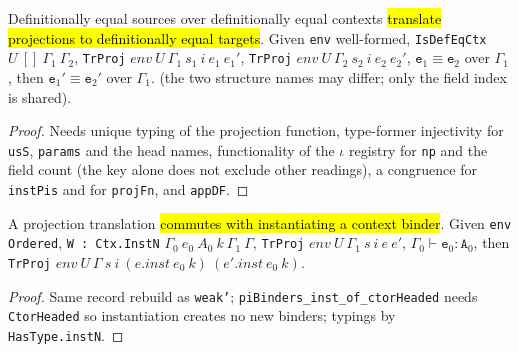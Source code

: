\begin{theorem}
\label{thm:trproj-uniq}
\leanok
{}
 

 Definitionally equal sources over definitionally equal contexts \hl{translate projections to definitionally equal targets}. Given \texttt{env} well-formed, \texttt{IsDefEqCtx} $U\ []\ \Gamma_1\ \Gamma_2$, \texttt{TrProj} $env\ U\ \Gamma_1\ s_1\ i\ e_1\ e_1'$, \texttt{TrProj} $env\ U\ \Gamma_2\ s_2\ i\ e_2\ e_2'$, $\texttt{e}_1 \equiv \texttt{e}_2$ over $\Gamma_1$, then $\texttt{e}_1' \equiv \texttt{e}_2'$ over $\Gamma_1$. (the two structure names may differ; only the field index is shared).
\end{theorem}
\begin{proof}
\stSorry{} Needs unique typing of the projection function, type-former injectivity for \texttt{usS}, \texttt{params} and the head names, functionality of the $\iota$ registry for \texttt{np} and the field count (the key alone does not exclude other readings), a congruence for \texttt{instPis} and for \texttt{projFn}, and \texttt{appDF}.
\end{proof}

\begin{theorem}
\label{thm:trproj-instn}
\leanok
{}
 

 A projection translation \hl{commutes with instantiating a context binder}. Given \texttt{env} \texttt{Ordered}, \texttt{W : Ctx.InstN} $\Gamma_0\ e_0\ A_0\ k\ \Gamma_1\ \Gamma$, \texttt{TrProj} $env\ U\ \Gamma_1\ s\ i\ e\ e'$, $\Gamma_0 \vdash \texttt{e}_0 : \texttt{A}_0$, then \texttt{TrProj} $env\ U\ \Gamma\ s\ i\ (e.inst\ e_0\ k)\ (e'.inst\ e_0\ k)$.
\end{theorem}
\begin{proof}
\leanok
{} Same record rebuild as \texttt{weak'}; \texttt{piBinders\_inst\_of\_ctorHeaded} needs \texttt{CtorHeaded} so instantiation creates no new binders; typings by \texttt{HasType.instN}.
\end{proof}

